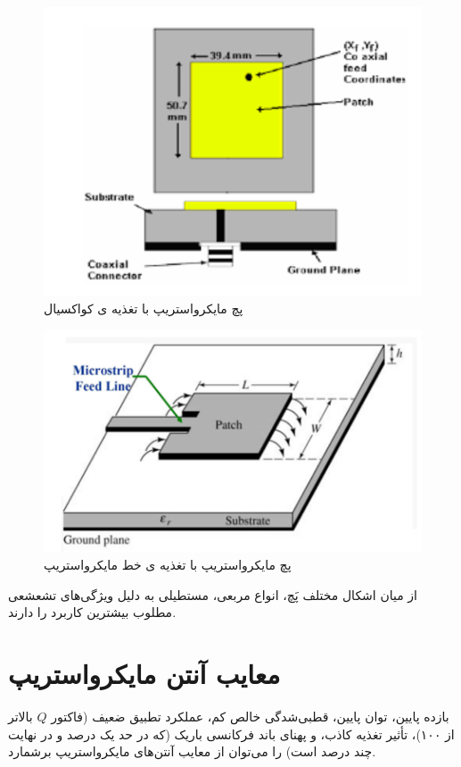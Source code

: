 \begin{figure}
\centering
\includegraphics[scale=0.5]{Images/fig1.png}
\caption{پچ مایکرواستریپ با تغذیه ی کواکسیال}
\label{fig1}
\end{figure}
\begin{figure}
	\centering
	\includegraphics[scale=0.3]{Images/fig2.png}
	\caption{پچ مایکرواستریپ با تغذیه ی خط مایکرواستریپ}
	\label{fig2}
\end{figure}


از میان اشکال مختلف پَچ، انواع مربعی، مستطیلی به دلیل ویژگی‌های تشعشعی مطلوب بیشترین کاربرد را دارند.

\section{معایب آنتن مایکرواستریپ}
بازده پایین، توان پایین، قطبی‌شدگی خالص کم، عملکرد تطبیق ضعیف (فاکتور
$Q$
 بالاتر از ۱۰۰)، تأثیر تغذیه کاذب، و پهنای باند فرکانسی باریک (که در حد یک درصد و در نهایت چند درصد است) را می‌توان از معایب آنتن‌های مایکرواستریپ برشمارد.

